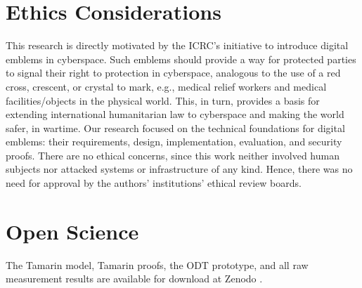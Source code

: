 \documentclass[letterpaper,twocolumn,10pt]{article}
\begin{document}
\section*{Ethics Considerations}
This research is directly motivated by the ICRC's initiative to introduce digital emblems in cyberspace.
Such emblems should provide a way for protected parties to signal their right to protection in cyberspace,
analogous to the use of a red cross, crescent, or crystal to mark, e.g., medical relief workers and medical
facilities/objects in the physical world. This, in turn, provides a basis for extending international
humanitarian law to cyberspace and making the world safer, in wartime.
Our research focused on the technical foundations for digital emblems: their requirements, design,
implementation, evaluation, and security proofs.
There are no ethical concerns, since this work neither involved human subjects nor attacked
systems or infrastructure of any kind. Hence, there was no need for approval by the authors' institutions'
ethical review boards.

\section*{Open Science}
The Tamarin model, Tamarin proofs, the ODT prototype, and all raw measurement results are available for
download at Zenodo \cite{ODT-zenodo}.

\printbibliography
\end{document}
